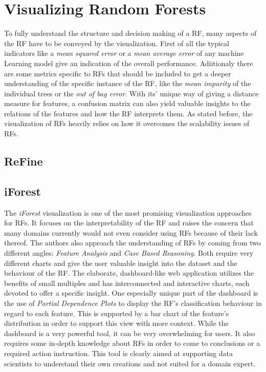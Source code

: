 \documentclass[a4paper, 12pt]{article}
\begin{document}
\section{Visualizing Random Forests}
To fully understand the structure and decision making of a RF, many aspects of the RF have to
be conveyed by the visualization. First of all the typical indicators like a 
\textit{mean squared error} or a \textit{mean average error} of any machine Learning model
give an indication of the overall performance. Adiitionaly there are some metrics specific
to RFs that should be included to get a deeper understanding of the specific instance of the
RF, like the \textit{mean impurity} of the individual trees or the 
\textit{out of bag error}. With its' unique way of giving a distance measure for features,
a confusion matrix can also yield valuable insights to the relations of the features and how
the RF interprets them. As stated before, the visualization of RFs heavily relies on how it
overcomes the scalability issues of RFs.

\subsection{ReFine}


\subsection{iForest}
The \textit{iForest} visualization is one of the most promising visualization approaches for RFs.
\cite{zhao2018iforest} It focuses on the interpretability of the RF and raises the concern
that many domains currently would not even consider using RFs because of their lack thereof.
The authors also approach the understanding of RFs by coming from two different angles:
\textit{Feature Analysis} and \textit{Case Based Reasoning}.
Both require very different charts and give the user valuable insight into the dataset and
the behaviour of the RF. The elaborate, dashboard-like web application utilizes the benefits
of small multiples and has interconnected and interactive charts, each devoted to offer a
specific insight. One especially unique part of the dashboard is the use of
\textit{Partial Dependence Plots} to display the RF's classification behaviour in regard to
each feature. This is supported by a bar chart of the feature's distribution in order to
support this view with more context.
While the dashboard is a very powerful tool, it can be very overwhelming for users. It also
requires some in-depth knowledge about RFs in order to come to conclusions or a required
action instruction. This tool is clearly aimed at supporting data scientists to understand
their own creations and not suited for a domain expert.
\end{document}
